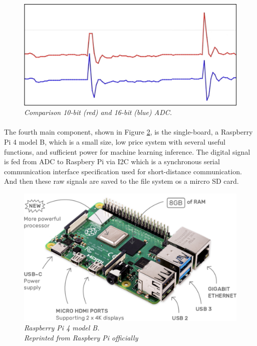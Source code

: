 \begin{figure}[H]
  \centering
  \caption[Comparison 10-bit (red) and 16-bit (blue) ADC.]{\emph{Comparison 10-bit (red) and 16-bit (blue) ADC.}}\label{fig:adc}
  \includegraphics[scale = 0.3]{figures/ADC.jpg}  
\end{figure}

\paragraph{}
The fourth main component, shown in Figure \ref{fig:pi4}, is the single-board, a Raspberry Pi 4 model B, which is a small size, low price system with several useful functions, and sufficient power for machine learning inference. The digital signal is fed from ADC to Raspbery Pi via I2C which is a synchronous serial communication interface specification used for short-distance communication. And then these raw signals are saved to the file system os a mircro SD card.

\begin{figure}[H]
  \centering
  \caption[Raspberry Pi 4 model B.]{\emph{Raspberry Pi 4 model B. \\ Reprinted from Raspbery Pi officially}}\label{fig:pi4}
  \includegraphics[scale = 0.14]{figures/pi4.jpg}  
\end{figure}

